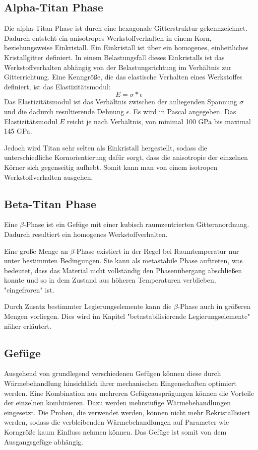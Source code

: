 \documentclass[a4paper, 11pt]{tubsreprt}
\begin{document}
\subsection{Alpha-Titan Phase}
Die alpha-Titan Phase ist durch eine hexagonale Gitterstruktur gekennzeichnet. Dadurch entsteht ein anisotropes Werkstoffverhalten in einem Korn, beziehungsweise Einkristall.
Ein Einkristall ist über ein homogenes, einheitliches Kristallgitter definiert.
In einem Belastungsfall dieses Einkristalls ist das Werkstoffverhalten abhängig von der Belastungsrichtung im Verhältnis zur Gitterrichtung. Eine Kenngröße, die das elastische Verhalten eines Werkstoffes definiert, ist das Elastizitätsmodul: 
\begin{equation}
E=\sigma*\epsilon
\end{equation}
Das Elastizitätsmodul ist das Verhältnis zwischen der anliegenden Spannung $\sigma$ und die dadurch resultierende Dehnung $\epsilon$.
Es wird in Pascal angegeben. Das Elastizitätsmodul $E$ reicht je nach Verhältnis, von minimal 100 GPa bis maximal 145 GPa. 

Jedoch wird Titan sehr selten als Einkristall hergestellt, sodass die unterschiedliche Kornorientierung dafür sorgt, dass die anisotropie der einzelnen Körner sich gegenseitig aufhebt. Somit kann man von einem isotropen Werkstoffverhalten ausgehen.


\subsection{Beta-Titan Phase}
Eine $\beta$-Phase ist ein Gefüge mit einer kubisch raumzentrierten Gitteranordnung. Dadurch resultiert ein homogenes Werkstoffverhalten.

Eine große Menge an $\beta$-Phase existiert in der Regel bei Raumtemperatur nur unter bestimmten Bedingungen. Sie kann als metastabile Phase auftreten, was bedeutet, dass das Material nicht vollständig den Phasenübergang abschließen konnte und so in dem Zustand aus höheren Temperaturen verblieben, "eingefroren" ist.  

Durch Zusatz bestimmter Legierungselemente kann die $\beta$-Phase auch in größeren Mengen vorliegen. Dies wird im Kapitel "betastabilisierende Legierungselemente" näher erläutert.
\subsection{Gefüge}
Ausgehend von grundlegend verschiedenen Gefügen können diese durch Wärmebehandlung hinsichtlich ihrer mechanischen Eingenschaften optimiert werden. Eine Kombination aus mehreren Gefügeausprägungen können die Vorteile der einzelnen kombinieren. Dazu werden mehrstufige Wärmebehandlungen eingesetzt. Die Proben, die verwendet werden, können nicht mehr Rekristallisiert werden, sodass die verbleibenden Wärmebehandlungen auf Parameter wie Korngröße kaum Einfluss nehmen können. Das Gefüge ist somit von dem Ausgangsgefüge abhängig.  
\end{document}
